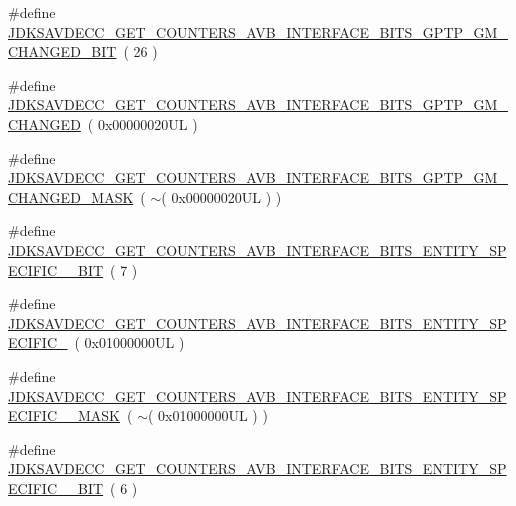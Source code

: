 \begin{DoxyCompactItemize}
\item 
\#define \hyperlink{group__get__counters__avb__interface__bits_gaa0e41a0d4e605cbba1a34058291db21e}{J\+D\+K\+S\+A\+V\+D\+E\+C\+C\+\_\+\+G\+E\+T\+\_\+\+C\+O\+U\+N\+T\+E\+R\+S\+\_\+\+A\+V\+B\+\_\+\+I\+N\+T\+E\+R\+F\+A\+C\+E\+\_\+\+B\+I\+T\+S\+\_\+\+G\+P\+T\+P\+\_\+\+G\+M\+\_\+\+C\+H\+A\+N\+G\+E\+D\+\_\+\+B\+IT}~( 26 )
\item 
\#define \hyperlink{group__get__counters__avb__interface__bits_gaa29338bfe739b6e9abf4600c7fef88bf}{J\+D\+K\+S\+A\+V\+D\+E\+C\+C\+\_\+\+G\+E\+T\+\_\+\+C\+O\+U\+N\+T\+E\+R\+S\+\_\+\+A\+V\+B\+\_\+\+I\+N\+T\+E\+R\+F\+A\+C\+E\+\_\+\+B\+I\+T\+S\+\_\+\+G\+P\+T\+P\+\_\+\+G\+M\+\_\+\+C\+H\+A\+N\+G\+ED}~( 0x00000020\+U\+L )
\item 
\#define \hyperlink{group__get__counters__avb__interface__bits_gaa41942e01a724ccc12b280f2bbe0699b}{J\+D\+K\+S\+A\+V\+D\+E\+C\+C\+\_\+\+G\+E\+T\+\_\+\+C\+O\+U\+N\+T\+E\+R\+S\+\_\+\+A\+V\+B\+\_\+\+I\+N\+T\+E\+R\+F\+A\+C\+E\+\_\+\+B\+I\+T\+S\+\_\+\+G\+P\+T\+P\+\_\+\+G\+M\+\_\+\+C\+H\+A\+N\+G\+E\+D\+\_\+\+M\+A\+SK}~( $\sim$( 0x00000020\+U\+L ) )
\item 
\#define \hyperlink{group__get__counters__avb__interface__bits_ga930130709e9f933d686711ae29e2e272}{J\+D\+K\+S\+A\+V\+D\+E\+C\+C\+\_\+\+G\+E\+T\+\_\+\+C\+O\+U\+N\+T\+E\+R\+S\+\_\+\+A\+V\+B\+\_\+\+I\+N\+T\+E\+R\+F\+A\+C\+E\+\_\+\+B\+I\+T\+S\+\_\+\+E\+N\+T\+I\+T\+Y\+\_\+\+S\+P\+E\+C\+I\+F\+I\+C\+\_\+\_\+\+B\+IT}~( 7 )
\item 
\#define \hyperlink{group__get__counters__avb__interface__bits_ga6acd6fdb70f71cec3b827d9fc250a697}{J\+D\+K\+S\+A\+V\+D\+E\+C\+C\+\_\+\+G\+E\+T\+\_\+\+C\+O\+U\+N\+T\+E\+R\+S\+\_\+\+A\+V\+B\+\_\+\+I\+N\+T\+E\+R\+F\+A\+C\+E\+\_\+\+B\+I\+T\+S\+\_\+\+E\+N\+T\+I\+T\+Y\+\_\+\+S\+P\+E\+C\+I\+F\+I\+C\+\_}~( 0x01000000\+U\+L )
\item 
\#define \hyperlink{group__get__counters__avb__interface__bits_gacf81c229dc9eb2dc8ff9a482d72f045b}{J\+D\+K\+S\+A\+V\+D\+E\+C\+C\+\_\+\+G\+E\+T\+\_\+\+C\+O\+U\+N\+T\+E\+R\+S\+\_\+\+A\+V\+B\+\_\+\+I\+N\+T\+E\+R\+F\+A\+C\+E\+\_\+\+B\+I\+T\+S\+\_\+\+E\+N\+T\+I\+T\+Y\+\_\+\+S\+P\+E\+C\+I\+F\+I\+C\+\_\+\_\+\+M\+A\+SK}~( $\sim$( 0x01000000\+U\+L ) )
\item 
\#define \hyperlink{group__get__counters__avb__interface__bits_gad9450f392aabf6d8565b730f147c9255}{J\+D\+K\+S\+A\+V\+D\+E\+C\+C\+\_\+\+G\+E\+T\+\_\+\+C\+O\+U\+N\+T\+E\+R\+S\+\_\+\+A\+V\+B\+\_\+\+I\+N\+T\+E\+R\+F\+A\+C\+E\+\_\+\+B\+I\+T\+S\+\_\+\+E\+N\+T\+I\+T\+Y\+\_\+\+S\+P\+E\+C\+I\+F\+I\+C\+\_\+\_\+\+B\+IT}~( 6 )

\end{DoxyCompactItemize}
